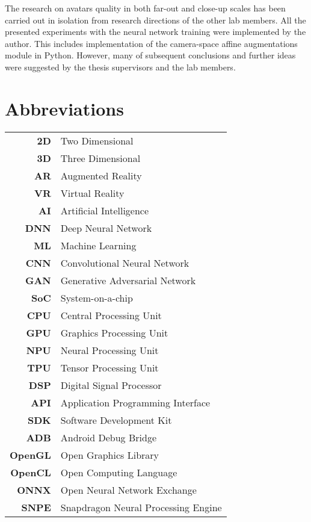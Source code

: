 The research on avatars quality in both far-out and close-up scales has been carried out in isolation from research directions of the other lab members. All the presented experiments with the neural network training were implemented by the author. This includes implementation of the camera-space affine augmentations module in Python. However, many of subsequent conclusions and further ideas were suggested by the thesis supervisors and the lab members.
 
\newpage
\section*{\centering Abbreviations}

\begin{table}[!ht]
	\vspace{-1em}
	\centering
	\begin{tabular}{>{\bf}r l}
		2D & Two Dimensional \\
		3D & Three Dimensional \\
		AR & Augmented Reality \\
		VR & Virtual Reality \\
		AI & Artificial Intelligence \\
		DNN & Deep Neural Network \\
		ML & Machine Learning \\
		CNN & Convolutional Neural Network \\
		GAN & Generative Adversarial Network \\
		SoC & System-on-a-chip \\
		CPU & Central Processing Unit \\
		GPU & Graphics Processing Unit \\
		NPU & Neural Processing Unit \\
		TPU & Tensor Processing Unit \\
		DSP & Digital Signal Processor \\
		API & Application Programming Interface \\
		SDK & Software Development Kit \\
		ADB & Android Debug Bridge \\
		OpenGL & Open Graphics Library \\
		OpenCL & Open Computing Language \\
		ONNX & Open Neural Network Exchange \\
		SNPE & Snapdragon Neural Processing Engine \\

\end{tabular}
\end{table}
